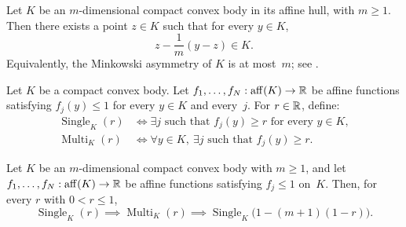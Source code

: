 \begin{unverified}
\begin{fact}
\label{fact:minkowski-asymmetry-center}
Let $K$ be an $m$-dimensional compact convex body in its affine hull, with
$m\geq 1$. Then there exists a point $z\in K$ such that for every $y\in K$,
\[
  z - \frac{1}{m}(y-z) \in K .
\]
Equivalently, the Minkowski asymmetry of $K$ is at most~$m$; see
\cite[definition of Minkowski asymmetry and the following standard bound]%
{BrandenbergGonzalezMerino2017Asymmetry}.
\end{fact}
\end{unverified}

\begin{unverified}
\begin{definition}
\label{def:single-multi-band-guards}
Let $K$ be a compact convex body. Let
$f_1,\ldots,f_N:\operatorname{aff}(K)\to\mathbb{R}$ be affine functions satisfying
$f_j(y)\leq 1$ for every $y\in K$ and every~$j$. For $r\in\mathbb{R}$, define:
\[
\begin{aligned}
  \operatorname{Single}_K(r)
  &\iff
  \exists j \text{ such that } f_j(y)\geq r
  \text{ for every } y\in K,\\
  \operatorname{Multi}_K(r)
  &\iff
  \forall y\in K,\ \exists j \text{ such that } f_j(y)\geq r .
\end{aligned}
\]
\end{definition}
\end{unverified}

\begin{unverified}
\begin{theorem}
\label{thm:single-multi-band-comparison}
Let $K$ be an $m$-dimensional compact convex body with $m\geq 1$, and let
$f_1,\ldots,f_N:\operatorname{aff}(K)\to\mathbb{R}$ be affine functions satisfying
$f_j\leq 1$ on~$K$. Then, for every $r$ with $0<r\leq 1$,
\[
  \operatorname{Single}_K(r)
  \implies
  \operatorname{Multi}_K(r)
  \implies
  \operatorname{Single}_K\bigl(1-(m+1)(1-r)\bigr).
\]
\end{theorem}
\end{unverified}

